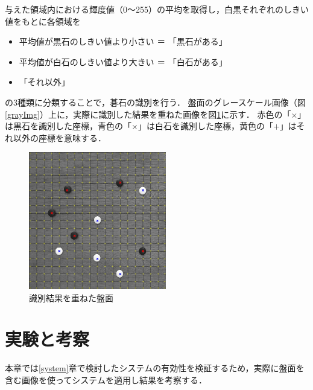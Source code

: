 \documentclass[openright]{nitocs}
\numberwithin{equation}{section}
\begin{document}
            与えた領域内における輝度値（0～255）の平均を取得し，白黒それぞれのしきい値をもとに各領域を
            \begin{itemize} %
                \item 平均値が黒石のしきい値より小さい ＝ 「黒石がある」
                \item 平均値が白石のしきい値より大きい ＝ 「白石がある」
                \item 「それ以外」
            \end{itemize}
            の3種類に分類することで，碁石の識別を行う．
            盤面のグレースケール画像（図\ref{grayImg}）上に，実際に識別した結果を重ねた画像を図\ref{result}に示す．
            赤色の「$\times$」は黒石を識別した座標，青色の「$\times$」は白石を識別した座標，黄色の「$+$」はそれ以外の座標を意味する．

            \begin{figure}[tb] %
                \begin{center}
                \includegraphics[clip,width=60mm]{DSC_0041/result.jpg} 
                \caption{識別結果を重ねた盤面}
                \label{result}
                \end{center}
            \end{figure}

    \section{実験と考察} %
        本章では\ref{system}章で検討したシステムの有効性を検証するため，実際に盤面を含む画像を使ってシステムを適用し結果を考察する．
\end{document}
